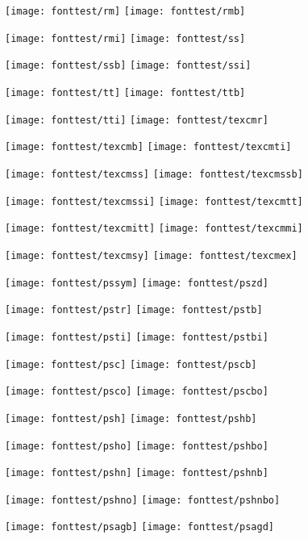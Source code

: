 
\texttt{[image: fonttest/rm]}\hfill
\texttt{[image: fonttest/rmb]}

\texttt{[image: fonttest/rmi]}\hfill
\texttt{[image: fonttest/ss]}

\texttt{[image: fonttest/ssb]}\hfill
\texttt{[image: fonttest/ssi]}

\texttt{[image: fonttest/tt]}\hfill
\texttt{[image: fonttest/ttb]}

\texttt{[image: fonttest/tti]}\hfill
\texttt{[image: fonttest/texcmr]}

\texttt{[image: fonttest/texcmb]}\hfill
\texttt{[image: fonttest/texcmti]}

\texttt{[image: fonttest/texcmss]}\hfill
\texttt{[image: fonttest/texcmssb]}

\texttt{[image: fonttest/texcmssi]}\hfill
\texttt{[image: fonttest/texcmtt]}

\texttt{[image: fonttest/texcmitt]}\hfill
\texttt{[image: fonttest/texcmmi]}

\texttt{[image: fonttest/texcmsy]}\hfill
\texttt{[image: fonttest/texcmex]}

\texttt{[image: fonttest/pssym]}\hfill
\texttt{[image: fonttest/pszd]}


\texttt{[image: fonttest/pstr]}\hfill
\texttt{[image: fonttest/pstb]}

\texttt{[image: fonttest/psti]}\hfill
\texttt{[image: fonttest/pstbi]}

\texttt{[image: fonttest/psc]}\hfill
\texttt{[image: fonttest/pscb]}

\texttt{[image: fonttest/psco]}\hfill
\texttt{[image: fonttest/pscbo]}

\texttt{[image: fonttest/psh]}\hfill
\texttt{[image: fonttest/pshb]}

\texttt{[image: fonttest/psho]}\hfill
\texttt{[image: fonttest/pshbo]}


\texttt{[image: fonttest/pshn]}\hfill
\texttt{[image: fonttest/pshnb]}

\texttt{[image: fonttest/pshno]}\hfill
\texttt{[image: fonttest/pshnbo]}

\texttt{[image: fonttest/psagb]}\hfill
\texttt{[image: fonttest/psagd]}

